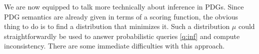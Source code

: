 \documentclass[twoside]{article}
\begin{document}
We are now equipped to talk more technically about inference in PDGs. 
Since PDG semantics are already given in terms of a scoring function,
the obvious thing to do is to find a distribution that minimizes it.
Such a distribution $\mu$ could straightforwardly be used to answer probabilistic queries \eqref{q:inf} and compute inconsistency.  
There are some immediate difficulties with this approach.
\end{document}
